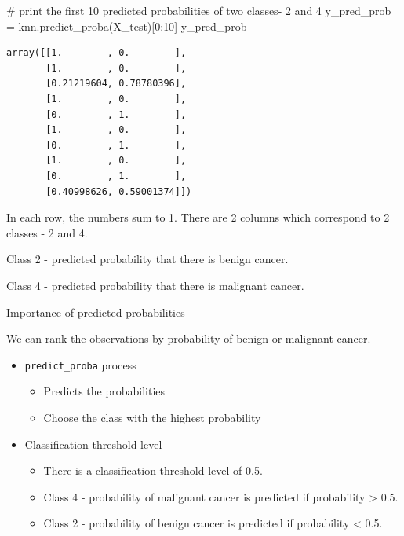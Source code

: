 \documentclass[
  letterpaper,
  DIV=11,
  numbers=noendperiod]{scrreprt}
\newenvironment{Shaded}{\begin{snugshade}}{\end{snugshade}}
\newcommand{\CommentTok}[1]{\textcolor[rgb]{0.37,0.37,0.37}{#1}}
\newcommand{\DecValTok}[1]{\textcolor[rgb]{0.68,0.00,0.00}{#1}}
\newcommand{\NormalTok}[1]{\textcolor[rgb]{0.00,0.23,0.31}{#1}}
\newcommand{\OperatorTok}[1]{\textcolor[rgb]{0.37,0.37,0.37}{#1}}
\begin{document}
\begin{Shaded}
\begin{Highlighting}[]
\CommentTok{\# print the first 10 predicted probabilities of two classes{-} 2 and 4}
\NormalTok{y\_pred\_prob }\OperatorTok{=}\NormalTok{ knn.predict\_proba(X\_test)[}\DecValTok{0}\NormalTok{:}\DecValTok{10}\NormalTok{]}
\NormalTok{y\_pred\_prob}
\end{Highlighting}
\end{Shaded}

\begin{verbatim}
array([[1.        , 0.        ],
       [1.        , 0.        ],
       [0.21219604, 0.78780396],
       [1.        , 0.        ],
       [0.        , 1.        ],
       [1.        , 0.        ],
       [0.        , 1.        ],
       [1.        , 0.        ],
       [0.        , 1.        ],
       [0.40998626, 0.59001374]])
\end{verbatim}

In each row, the numbers sum to 1. There are 2 columns which correspond
to 2 classes - 2 and 4.

Class 2 - predicted probability that there is benign cancer.

Class 4 - predicted probability that there is malignant cancer.

Importance of predicted probabilities

We can rank the observations by probability of benign or malignant
cancer.

\begin{itemize}
\item
  \texttt{predict\_proba} process

  \begin{itemize}
  \item
    Predicts the probabilities
  \item
    Choose the class with the highest probability
  \end{itemize}
\item
  Classification threshold level

  \begin{itemize}
  \item
    There is a classification threshold level of 0.5.
  \item
    Class 4 - probability of malignant cancer is predicted if
    probability \textgreater{} 0.5.
  \item
    Class 2 - probability of benign cancer is predicted if probability
    \textless{} 0.5.
  \end{itemize}
\end{itemize}
\end{document}
